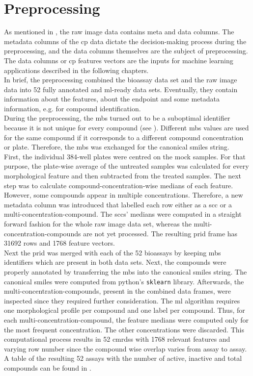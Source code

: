 \section{Preprocessing}\label{sec:prepro}
As mentioned in , the raw image data contains meta and data columns. The metadata columns of the \ac{cp} data dictate the decision-making process during the preprocessing, and the data columns themselves are the subject of preprocessing. The data columns or \ac{cp} features vectors are the inputs for machine learning applications described in the following chapters.\\
In brief, the preprocessing combined the bioassay data set and the raw image data into \num{52} fully annotated and \ac{ml}-ready data sets. Eventually, they contain information about the features, about the endpoint and some metadata information, e.g. for compound identification.\\
During the preprocessing, the \acl{mbs} turned out to be a suboptimal identifier because it is not unique for every compound (see ). Different \acl{mbs} values are used for the same compound if it corresponds to a different compound concentration or plate. Therefore, the \acl{mbs} was exchanged for the canonical \ac{smiles} string.\\
First, the individual \num{384}-well plates were centred on the mock samples. For that purpose, the plate-wise average of the untreated samples was calculated for every morphological feature and then subtracted from the treated samples. The next step was to calculate compound-concentration-wise medians of each feature. However, some compounds appear in multiple concentrations. Therefore, a new metadata column was introduced that labelled each row either as a \acl{scc} or a multi-concentration-compound. The \aclp{scc}' medians were computed in a straight forward fashion for the whole raw image data set, whereas the multi-concentration-compounds are not yet processed. The resulting \acl{prid} frame has \num{31692} rows and \num{1768} feature vectors.\\
Next the \acl{prid} was merged with each of the \num{52} bioassays by keeping \acl{mbs} identifiers which are present in both data sets. Next, the compounds were properly annotated by transferring the \acl{mbs} into the canonical \ac{smiles} string. The canonical \ac{smiles} were computed from python's \texttt{sklearn} library. Afterwards, the multi-concentration-compounds, present in the combined data frames, were inspected since they required further consideration. The \ac{ml} algorithm requires one morphological profile per compound and one label per compound. Thus, for each multi-concentration-compound, the feature medians were computed only for the most frequent concentration. The other concentrations were discarded. This computational process results in \num{52} \aclp{cmrds} with \num{1768} relevant features and varying row number since the compound wise overlap varies from assay to assay. A table of the resulting 52 assays with the number of active, inactive and total compounds can be found in .
